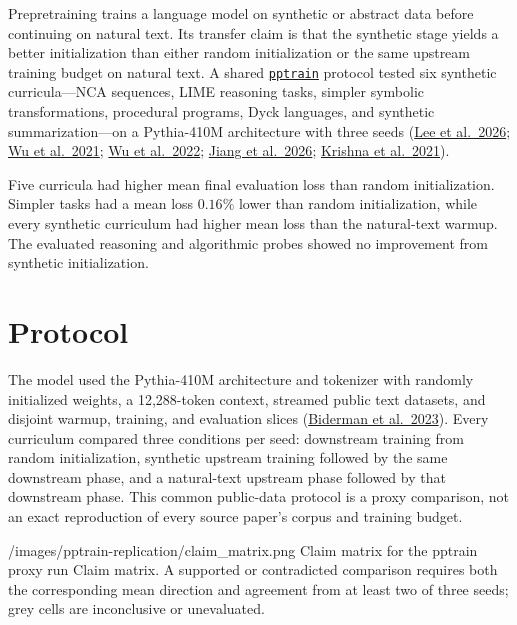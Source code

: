 \documentclass[11pt]{article}
\begin{document}
Prepretraining trains a language model on synthetic or abstract data before continuing on natural text. Its transfer claim is that the synthetic stage yields a better initialization than either random initialization or the same upstream training budget on natural text. A shared \href{https://github.com/Axym-Labs/pptrain}{\texttt{pptrain}} protocol tested six synthetic curricula---NCA sequences, LIME reasoning tasks, simpler symbolic transformations, procedural programs, Dyck languages, and synthetic summarization---on a Pythia-410M architecture with three seeds (\href{https://arxiv.org/abs/2603.10055}{Lee et al.~2026}; \href{https://proceedings.mlr.press/v139/wu21c.html}{Wu et al.~2021}; \href{https://arxiv.org/abs/2206.10139}{Wu et al.~2022}; \href{https://arxiv.org/abs/2601.21725}{Jiang et al.~2026}; \href{https://aclanthology.org/2021.findings-emnlp.273/}{Krishna et al.~2021}).

Five curricula had higher mean final evaluation loss than random initialization. Simpler tasks had a mean loss \(0.16\%\) lower than random initialization, while every synthetic curriculum had higher mean loss than the natural-text warmup. The evaluated reasoning and algorithmic probes showed no improvement from synthetic initialization.

\section{Protocol}\label{protocol}

The model used the Pythia-410M architecture and tokenizer with randomly initialized weights, a 12,288-token context, streamed public text datasets, and disjoint warmup, training, and evaluation slices (\href{https://arxiv.org/abs/2304.01373}{Biderman et al.~2023}). Every curriculum compared three conditions per seed: downstream training from random initialization, synthetic upstream training followed by the same downstream phase, and a natural-text upstream phase followed by that downstream phase. This common public-data protocol is a proxy comparison, not an exact reproduction of every source paper's corpus and training budget.

  {/images/pptrain-replication/claim_matrix.png}
  {Claim matrix for the pptrain proxy run}
  {Claim matrix. A supported or contradicted comparison requires both the corresponding mean direction and agreement from at least two of three seeds; grey cells are inconclusive or unevaluated.}
\end{document}
